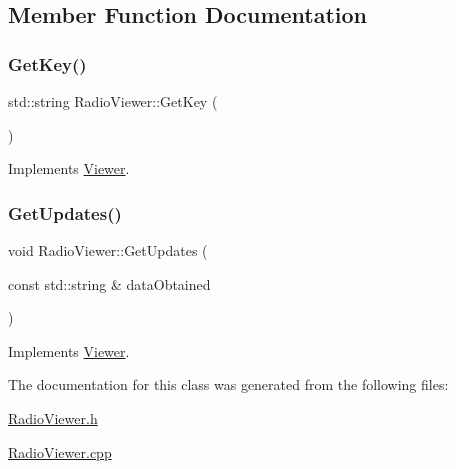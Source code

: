 \subsection{Member Function Documentation}
\mbox{\label{class_radio_viewer_a24b69945b935d384749282fbad9ad606}} 
\subsubsection{\texorpdfstring{GetKey()}{GetKey()}}
{\footnotesize\ttfamily std\+::string Radio\+Viewer\+::\+Get\+Key (\begin{DoxyParamCaption}{ }\end{DoxyParamCaption})\hspace{0.3cm}{\ttfamily [virtual]}}



Implements \mbox{\hyperlink{class_viewer_a9937df0f2be6a32f2d756605dc239d1d}{Viewer}}.

\mbox{\label{class_radio_viewer_a6600dc7ffbf75ad3ffebbe7b9e89f51e}} 
\subsubsection{\texorpdfstring{GetUpdates()}{GetUpdates()}}
{\footnotesize\ttfamily void Radio\+Viewer\+::\+Get\+Updates (\begin{DoxyParamCaption}\item[{const std\+::string \&}]{data\+Obtained }\end{DoxyParamCaption})\hspace{0.3cm}{\ttfamily [virtual]}}



Implements \mbox{\hyperlink{class_viewer_afc23a6059e52f018df843de22b641d83}{Viewer}}.



The documentation for this class was generated from the following files\+:\begin{DoxyCompactItemize}
\item 
\mbox{\hyperlink{_radio_viewer_8h}{Radio\+Viewer.\+h}}\item 
\mbox{\hyperlink{_radio_viewer_8cpp}{Radio\+Viewer.\+cpp}}\end{DoxyCompactItemize}
